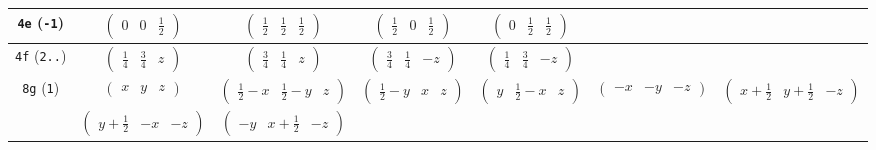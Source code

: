 \documentclass[fleqn,9pt,landscape]{jsarticle}
\begin{document}
\begin{center}
\begin{longtable}{ccccccc}
{\tt 4e} ({\tt -1}) & $ \begin{pmatrix} 0 & 0 & \frac{1}{2} \end{pmatrix} $ & $ \begin{pmatrix} \frac{1}{2} & \frac{1}{2} & \frac{1}{2} \end{pmatrix} $ & $ \begin{pmatrix} \frac{1}{2} & 0 & \frac{1}{2} \end{pmatrix} $ & $ \begin{pmatrix} 0 & \frac{1}{2} & \frac{1}{2} \end{pmatrix} $ & $  $ & $  $ \\ \hline
{\tt 4f} ({\tt 2..}) & $ \begin{pmatrix} \frac{1}{4} & \frac{3}{4} & z \end{pmatrix} $ & $ \begin{pmatrix} \frac{3}{4} & \frac{1}{4} & z \end{pmatrix} $ & $ \begin{pmatrix} \frac{3}{4} & \frac{1}{4} & - z \end{pmatrix} $ & $ \begin{pmatrix} \frac{1}{4} & \frac{3}{4} & - z \end{pmatrix} $ & $  $ & $  $ \\ \hline
{\tt 8g} ({\tt 1}) & $ \begin{pmatrix} x & y & z \end{pmatrix} $ & $ \begin{pmatrix} \frac{1}{2} - x & \frac{1}{2} - y & z \end{pmatrix} $ & $ \begin{pmatrix} \frac{1}{2} - y & x & z \end{pmatrix} $ & $ \begin{pmatrix} y & \frac{1}{2} - x & z \end{pmatrix} $ & $ \begin{pmatrix} - x & - y & - z \end{pmatrix} $ & $ \begin{pmatrix} x + \frac{1}{2} & y + \frac{1}{2} & - z \end{pmatrix} $ \\
& $ \begin{pmatrix} y + \frac{1}{2} & - x & - z \end{pmatrix} $ & $ \begin{pmatrix} - y & x + \frac{1}{2} & - z \end{pmatrix} $ & $  $ & $  $ & $  $ & $  $ \\
\end{longtable}
\end{center}
\end{document}
